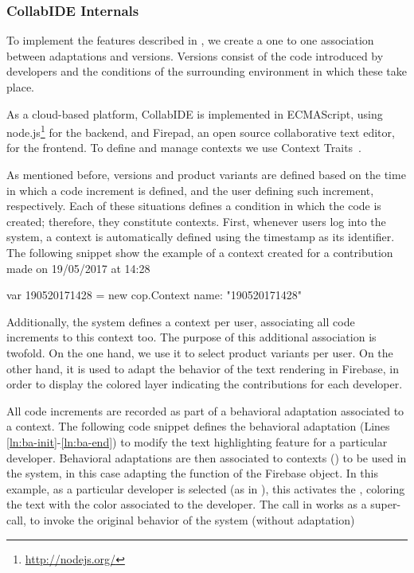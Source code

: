 \subsubsection{CollabIDE Internals}
To implement the features described in , we create a one to one association 
between adaptations and versions.
Versions consist of the code introduced by developers and the conditions of the surrounding 
environment in which these take place. 

As a cloud-based platform, CollabIDE is implemented in ECMAScript, using 
node.js\footnote{\url{http://nodejs.org/}} for the backend, and 
Firepad, an open source collaborative text editor, for the frontend.
To define and manage contexts we use Context Traits~\cite{gonzalez13}. 

As mentioned before, versions and product variants are defined based on the time in which a code 
increment is defined, and the user defining such increment, respectively. Each of these situations 
defines a condition in which the code is created; therefore, they constitute contexts.
First, whenever users log into the system, a context is automatically defined
using the timestamp as its identifier. The following snippet show the example of a context created 
for a contribution made on 19/05/2017 at 14:28
\vspace{-4ex}
\begin{ctxtraits}
 var 190520171428 = new cop.Context{
   name: "190520171428"
 }
\end{ctxtraits}
\vspace{-4ex}

Additionally, the system defines a context per user, associating all code increments to this context too. 
The purpose of this additional association is twofold. On the one hand, we use it to select product 
variants per user. On the other hand, it is used to adapt the behavior of the text rendering in Firebase, 
in order to display the colored layer indicating the contributions for each developer.

All code increments are recorded as part of a behavioral adaptation associated to a context. The 
following code snippet defines the behavioral adaptation (Lines \ref{ln:ba-init}-\ref{ln:ba-end}) to modify 
the text highlighting feature for a particular developer. Behavioral adaptations are then
associated to contexts () to be used in the system, in this case adapting the 
 function of the  Firebase object. In this example, as a 
particular developer is selected (as in ), this activates the , 
coloring the text with the color associated to the developer. The  call in  
works as a super-call, to invoke the original behavior of the system (\ie without adaptation)

